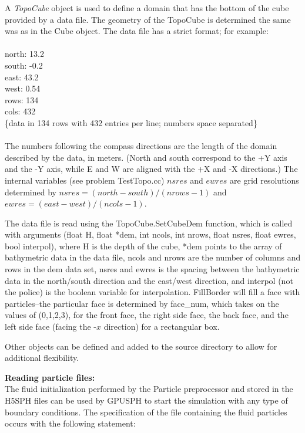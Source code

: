 \documentclass{../GPUSPHtemplate}
\begin{document}
A {\em TopoCube} object is used to define a domain that has the bottom
of the cube provided by a data file. The geometry of the TopoCube is
determined the same was as in the Cube object. The data file has a
strict format; for example: \\\\ north: 13.2 \\ south: -0.2\\ east:
43.2 \\ west: 0.54 \\ rows: 134\\ cols: 432 \\ \{data in 134 rows
with 432 entries per line; numbers space separated\}\\ \\ The numbers
following the compass directions are the length of the domain described
by the data, in meters. (North and south correspond to the +Y axis and
the -Y axis, while E and W are aligned with the +X and -X directions.)
The internal variables (see problem TestTopo.cc) $nsres$ and $ewres$ are
grid resolutions determined by $nsres= (north-south)/(nrows-1)$ and
$ewres= (east -west)/(ncols-1)$.

The data file is read using the TopoCube.SetCubeDem function, which is
called with arguments (float H, float *dem, int ncols, int nrows, float
nsres, float ewres, bool interpol), where H is the depth of the cube,
*dem points to the array of bathymetric data in the data file, ncols and
nrows are the number of columns and rows in the dem data set, nsres and
ewres is the spacing between the bathymetric data in the north/south
direction and the east/west direction, and interpol (not the police) is
the boolean variable for interpolation. FillBorder will fill a face
with particles--the particular face is determined by face\_num, which
takes on the values of (0,1,2,3), for the front face, the right side
face, the back face, and the left side face (facing the -$x$ direction)
for a rectangular box.

Other objects can be defined and added to the source directory to allow
for additional flexibility.

\textbf{Reading particle files:}\\

The fluid initialization performed by the Particle preprocessor and stored in the H5SPH 
files can be used by GPUSPH to start the simulation with any type of boundary conditions.
The specification of the file containing the fluid particles occurs with the following statement:
\end{document}
